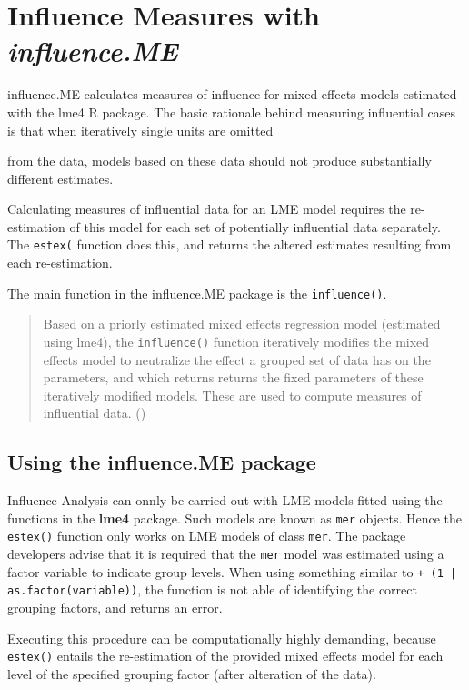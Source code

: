 \newpage
\section*{Influence Measures with \textit{influence.ME}}influence.ME calculates measures of influence for mixed effects models estimated with the lme4 R package. The
basic rationale behind measuring influential cases is that when iteratively single units are omitted

from the data, models based on these data should not produce substantially different estimates. 

Calculating measures of influential data for an LME model requires the re-estimation
of this model for each set of potentially influential data separately. The \texttt{estex(} function does this,
and returns the altered estimates resulting from each re-estimation. 

The main function in the influence.ME package is the \texttt{influence()}.

\begin{quote} Based on a priorly estimated
	mixed effects regression model (estimated using lme4), the \texttt{influence()} function iteratively modifies
	the mixed effects model to neutralize the effect a grouped set of data has on the parameters, and
	which returns returns the fixed parameters of these iteratively modified models. These are used to
	compute measures of influential data. ()
\end{quote}

\subsection*{Using the influence.ME package}
Influence Analysis can onnly be carried out with LME models fitted using the functions in the \textbf{lme4} package. Such models are known as \texttt{mer} objects.
Hence the \texttt{estex()} function only works on LME
models of class \texttt{mer}.
The package developers advise that it is required that the \texttt{mer} model was estimated using a factor variable to indicate group levels.
When using something similar to \texttt{+ (1 | as.factor(variable))}, the function is not able of
identifying the correct grouping factors, and returns an error.

Executing this procedure can be computationally highly demanding, because \texttt{estex()} entails the re-estimation of the provided mixed effects model for each level of the specified grouping factor (after alteration of the data).
